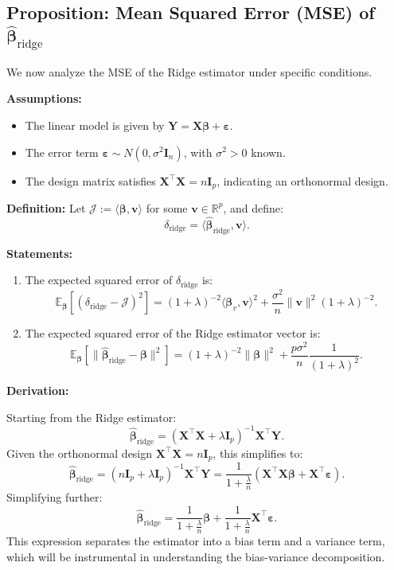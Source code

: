 \documentclass[open=any, 11pt,paper=A4]{scrreprt}
\begin{document}
\subsection*{Proposition: Mean Squared Error (MSE) of \(\hat{\bm{\beta}}_{\text{ridge}}\)}

We now analyze the MSE of the Ridge estimator under specific conditions.

\textbf{Assumptions:}
\begin{itemize}
    \item The linear model is given by \(\bm{Y} = \bm{X} \bm{\beta} + \bm{\varepsilon}\).
    \item The error term \(\bm{\varepsilon} \sim N(0, \sigma^2 \bm{I}_n)\), with \(\sigma^2 > 0\) known.
    \item The design matrix satisfies \(\bm{X}^\top \bm{X} = n \bm{I}_p\), indicating an orthonormal design.
\end{itemize}

\textbf{Definition:}
Let \(\mathcal{J} := \langle \bm{\beta}, \bm{v} \rangle\) for some \(\bm{v} \in \mathbb{R}^p\), and define:
\[
\delta_{\text{ridge}} = \langle \hat{\bm{\beta}}_{\text{ridge}}, \bm{v} \rangle.
\]

\textbf{Statements:}
\begin{enumerate}
    \item The expected squared error of \(\delta_{\text{ridge}}\) is:
    \[
    \mathbb{E}_{\bm{\beta}}[(\delta_{\text{ridge}} - \mathcal{J})^2] = (1 + \lambda)^{-2} \langle \bm{\beta}_v, \bm{v} \rangle^2 + \frac{\sigma^2}{n} \|\bm{v}\|^2 (1 + \lambda)^{-2}.
    \]
    
    \item The expected squared error of the Ridge estimator vector is:
    \[
    \mathbb{E}_{\bm{\beta}}[\|\hat{\bm{\beta}}_{\text{ridge}} - \bm{\beta}\|^2] = (1 + \lambda)^{-2} \|\bm{\beta}\|^2 + \frac{p \sigma^2}{n} \frac{1}{(1 + \lambda)^2}.
    \]
\end{enumerate}

\textbf{Derivation:}

Starting from the Ridge estimator:
\[
\hat{\bm{\beta}}_{\text{ridge}} = (\bm{X}^\top \bm{X} + \lambda \bm{I}_p)^{-1} \bm{X}^\top \bm{Y}.
\]
Given the orthonormal design \(\bm{X}^\top \bm{X} = n \bm{I}_p\), this simplifies to:
\[
\hat{\bm{\beta}}_{\text{ridge}} = \left(n \bm{I}_p + \lambda \bm{I}_p\right)^{-1} \bm{X}^\top \bm{Y} = \frac{1}{1 + \frac{\lambda}{n}} (\bm{X}^\top \bm{X} \bm{\beta} + \bm{X}^\top \bm{\varepsilon}).
\]
Simplifying further:
\[
\hat{\bm{\beta}}_{\text{ridge}} = \frac{1}{1 + \frac{\lambda}{n}} \bm{\beta} + \frac{1}{1 + \frac{\lambda}{n}} \bm{X}^\top \bm{\varepsilon}.
\]
This expression separates the estimator into a bias term and a variance term, which will be instrumental in understanding the bias-variance decomposition.
\end{document}
